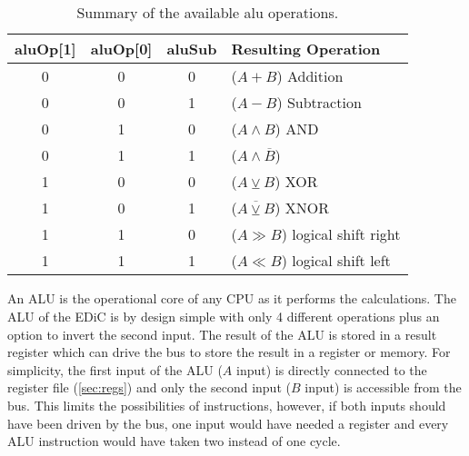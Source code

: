 \subsection{}\label{sec:alu}
\begin{table}
  \centering
  \renewcommand{\arraystretch}{1.25}
  \caption{Summary of the available alu operations.}
  \label{tab:aluOp}
  \begin{tabularx}{.8\textwidth}{ |c|c|c||X| }
    \hline
    aluOp[1] & aluOp[0] & aluSub & Resulting Operation             \\\hline\hline
    0        & 0        & 0      & ($A + B$) Addition              \\\hline
    0        & 0        & 1      & ($A - B$) Subtraction           \\\hline
    0        & 1        & 0      & ($A \land B$) AND               \\\hline
    0        & 1        & 1      & ($A \land \overline{B}$)        \\\hline
    1        & 0        & 0      & ($A \veebar B$) XOR             \\\hline
    1        & 0        & 1      & ($\overline{A \veebar B}$) XNOR \\\hline
    1        & 1        & 0      & ($A \gg B$) logical shift right \\\hline
    1        & 1        & 1      & ($A \ll B$) logical shift left  \\\hline
  \end{tabularx}
\end{table}
An \gls{ALU} is the operational core of any \gls{CPU} as it performs the calculations.
The \gls{ALU} of the \gls{EDiC} is by design simple with only 4 different operations plus an option to invert the second input.
The result of the \gls{ALU} is stored in a result register which can drive the bus to store the result in a register or memory.
For simplicity, the first input of the \gls{ALU} ($A$ input) is directly connected to the register file (\cref{sec:regs}) and only the second input ($B$ input) is accessible from the bus.
This limits the possibilities of instructions, however, if both inputs should have been driven by the bus, one input would have needed a register and every \gls{ALU} instruction would have taken two instead of one cycle.

